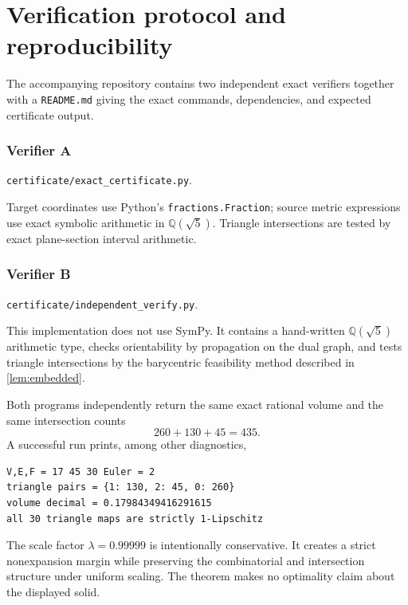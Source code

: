 \section{Verification protocol and reproducibility}\label{sec:repro}
The accompanying repository contains two independent exact verifiers together with a \texttt{README.md} giving the exact commands, dependencies, and expected certificate output.

\subsubsection*{Verifier A}
\texttt{certificate/exact\_certificate.py}.\par
Target coordinates use Python's \texttt{fractions.Fraction}; source metric expressions use exact symbolic arithmetic in $\mathbb Q(\sqrt5)$.  Triangle intersections are tested by exact plane-section interval arithmetic.

\subsubsection*{Verifier B}
\texttt{certificate/independent\_verify.py}.\par
This implementation does not use SymPy.  It contains a hand-written $\mathbb Q(\sqrt5)$ arithmetic type, checks orientability by propagation on the dual graph, and tests triangle intersections by the barycentric feasibility method described in \cref{lem:embedded}.

Both programs independently return the same exact rational volume and the same intersection counts
\[
260+130+45=435.
\]
A successful run prints, among other diagnostics,
\begin{verbatim}
V,E,F = 17 45 30 Euler = 2
triangle pairs = {1: 130, 2: 45, 0: 260}
volume decimal = 0.17984349416291615
all 30 triangle maps are strictly 1-Lipschitz
\end{verbatim}

The scale factor $\lambda=0.99999$ is intentionally conservative.  It creates a strict nonexpansion margin while preserving the combinatorial and intersection structure under uniform scaling.  The theorem makes no optimality claim about the displayed solid.

